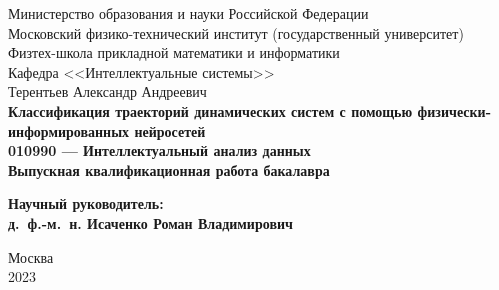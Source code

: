\documentclass[a4paper, 12pt]{article}
\begin{document}
	
	\thispagestyle{empty}
	\begin{center}
		\sc
		Министерство образования и науки Российской Федерации\\
		Московский физико-технический институт
		{\rm(государственный университет)}\\
		Физтех-школа прикладной математики и информатики\\
		Кафедра <<Интеллектуальные системы>>\\[35mm]
		\rm\large
		Терентьев Александр Андреевич\\[10mm]
		\bf\Large
		Классификация траекторий динамических систем с помощью физически-информированных нейросетей \\[10mm]
		\rm\normalsize
		010990 --- Интеллектуальный анализ данных\\[10mm]
		\sc
		Выпускная квалификационная работа бакалавра\\[10mm]
	\end{center}
	\hfill\parbox{80mm}{
		\begin{flushleft}
			\bf
			Научный руководитель:\\
			\rm
			д.~ф.-м.~н. 	
Исаченко Роман Владимирович\\[5cm]
		\end{flushleft}
	}
	\begin{center}
		Москва\\
		2023
	\end{center}
	
	\newpage
	\tableofcontents
	\newpage
	
\end{document}
